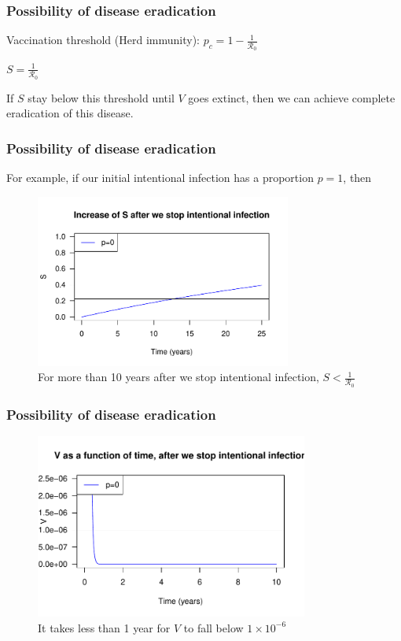 \documentclass{beamer}
\newcommand{\R}{\mathcal{R}}
\begin{document}
\begin{frame}
\frametitle{Possibility of disease eradication}

Vaccination threshold (Herd immunity): $p_c=1-\frac{1}{\R_0}$

\pause
\begin{center}
$S=\frac{1}{\R_0}$
\end{center}

\pause
If $S$ stay below this threshold until $V$ goes extinct, then we can achieve complete eradication of this disease.
\end{frame}
\begin{frame}
\frametitle{Possibility of disease eradication}

For example, if our initial intentional infection has a proportion $p=1$, then
\begin{figure}[H]
  \centering
  \includegraphics[width=0.75\textwidth]{Figures/Increase_of_S.pdf}
  \caption{For more than 10 years after we stop intentional infection, $S<\frac{1}{\R_0}$}
\label{figure:S_after_stop}
\end{figure}
\end{frame}
\begin{frame}
\frametitle{Possibility of disease eradication}
\begin{figure}[H]
  \centering
  \includegraphics[width=0.8\textwidth]{Figures/V_after_stop.pdf}
  \caption{It takes less than 1 year for $V$ to fall below $1\times10^{-6}$}
\end{figure}
\end{frame}
\end{document}
